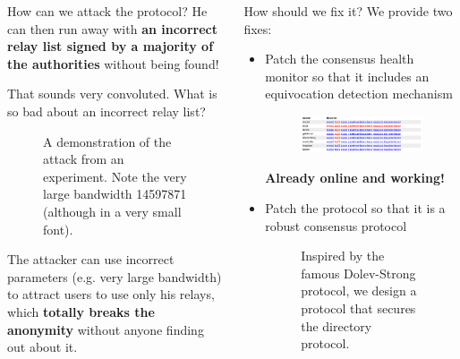 \documentclass{purdue-poster}
\begin{document}
\begin{frame}{}
\begin{columns}[c]
\begin{column}{.45\linewidth}
\begin{block}{\large How can we attack the protocol?}
        He can then run away with \textbf{an incorrect relay list signed by a majority of the authorities} without being found!
    \end{block}
    \begin{block}{\large That sounds very convoluted. What is so bad about an incorrect relay list?}
        \begin{figure}
            {\centering\par}
            \caption{A demonstration of the attack from an experiment. Note the very large bandwidth 14597871 (although in a very small font).}
        \end{figure}

        The attacker can use incorrect parameters (e.g. very large bandwidth) to attract users to use only his relays, which \textbf{totally breaks the anonymity} without anyone finding out about it.
    \end{block}
    \end{column}
    \begin{column}{.45\linewidth}
    \begin{block}{\large How should we fix it?}
        We provide two fixes:
        \begin{itemize}
            \item Patch the consensus health monitor so that it includes an equivocation detection mechanism
                \begin{figure}
                    {\centering\includegraphics[width=.8\linewidth]{fig/040-remedy.png}\par}
                \end{figure}
                \textbf{Already online and working!}
            \item Patch the protocol so that it is a robust consensus protocol
                \begin{figure}
                    {\centering}
                    \caption{Inspired by the famous Dolev-Strong protocol, we design a protocol that secures the directory protocol.}
                \end{figure}

\end{itemize}
\end{block}
\end{column}
\end{columns}
\end{frame}
\end{document}
